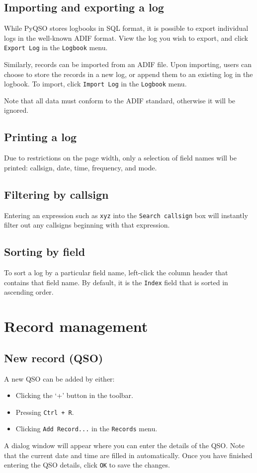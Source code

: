 \documentclass[11pt, a4paper]{report}
\begin{document}
\section{Importing and exporting a log}
While PyQSO stores logbooks in SQL format, it is possible to export individual logs in the well-known ADIF format. View the log you wish to export, and click \texttt{Export Log} in the \texttt{Logbook} menu.

Similarly, records can be imported from an ADIF file. Upon importing, users can choose to store the records in a new log, or append them to an existing log in the logbook. To import, click \texttt{Import Log} in the \texttt{Logbook} menu.

Note that all data must conform to the ADIF standard, otherwise it will be ignored.

\section{Printing a log}
Due to restrictions on the page width, only a selection of field names will be printed: callsign, date, time, frequency, and mode.

\section{Filtering by callsign}
Entering an expression such as \texttt{xyz} into the \texttt{Search callsign} box will instantly filter out any callsigns beginning with that expression.

\section{Sorting by field}
To sort a log by a particular field name, left-click the column header that contains that field name. By default, it is the \texttt{Index} field that is sorted in ascending order.

\chapter{Record management}\label{chap:record_management}

\section{New record (QSO)}
A new QSO can be added by either:
\begin{itemize}
  \item Clicking the `+' button in the toolbar.
  \item Pressing \texttt{Ctrl + R}.
  \item Clicking \texttt{Add Record...} in the \texttt{Records} menu.
\end{itemize}
A dialog window will appear where you can enter the details of the QSO. Note that the current date and time are filled in automatically. Once you have finished entering the QSO details, click \texttt{OK} to save the changes.
\end{document}
